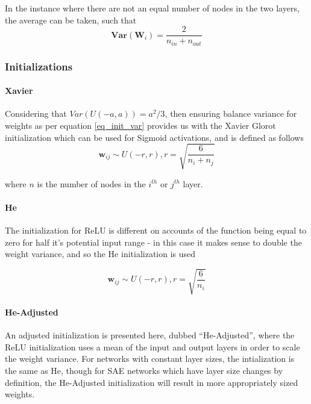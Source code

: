 \documentclass[a4paper,11pt,oneside]{article}
\theoremstyle{plain}
\theoremstyle{definition}
\begin{document}
	In the instance where there are not an equal number of nodes in the two layers, the average can be taken, such that
	\begin{equation}\label{eq_init_var}
	\mathbf{Var}(\mathbf{W}_i) = \frac{2}{n_{in} + n_{out}}
	\end{equation}
	
	\subsubsection{Initializations}
	
	\paragraph{Xavier} Considering that  $Var(U(-a, a)) = a^2/3$, then ensuring balance variance for weights as per equation \eqref{eq_init_var} provides us with the Xavier Glorot initialization \cite{Glorot} which can be used for Sigmoid activations, and is defined as follows
	\begin{equation}
	\mathbf{w}_{ij} \sim U(-r, r), r = \sqrt{\frac{6}{n_i + n_j}}
	\end{equation}
	
	where $n$ is the number of nodes in the $i^{th}$ or $j^{th}$ layer.
	\newline\newline
	\paragraph{He} The initialization for ReLU is different on accounts of the function being equal to zero for half it's potential input range - in this case it makes sense to double the weight variance, and so the He \cite{He} initialization is used
	
	\begin{equation}
	\mathbf{w}_{ij} \sim U(-r, r), r = \sqrt{\frac{6}{n_i}}
	\end{equation}
	
	
	\paragraph{He-Adjusted} An adjusted initialization is presented here, dubbed ``He-Adjusted'', where the ReLU initialization uses a mean of the input and output layers in order to scale the weight variance. For networks with constant layer sizes, the intialization is the same as He, though for SAE networks which have layer size changes by definition, the He-Adjusted initialization will result in more appropriately sized weights.
	
\end{document}
